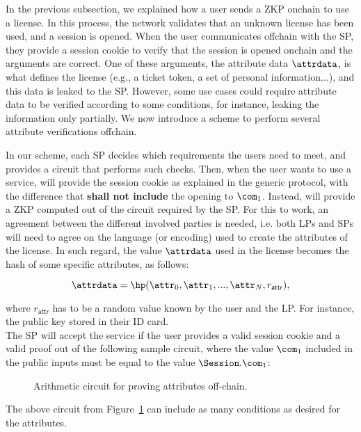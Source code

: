 
In the previous subsection, we explained how a user sends a ZKP onchain to use a license. In this process, the network validates that an unknown license has been used, and a session is opened. When the user communicates offchain with the SP, they provide a session cookie to verify that the session is opened onchain and the arguments are correct. One of these arguments, the attribute data $\attrdata$, is what defines the license (e.g., a ticket token, a set of personal information...), and this data is leaked to the SP. However, some use cases could require attribute data to be verified according to some conditions, for instance, leaking the information only partially. We now introduce a scheme to perform several attribute verifications offchain.

In our scheme, each SP decides which requirements the users need to meet, and provides a circuit that performs such checks. Then, when the user wants to use a service, will provide the session cookie as explained in the generic protocol, with the difference that \textbf{shall not include} the opening to $\com_1$. Instead, will provide a ZKP computed out of the circuit required by the SP. For this to work, an agreement between the different involved parties is needed, i.e. both LPs and SPs will need to agree on the language (or encoding) used to create the attributes of the license. In such regard, the value $\attrdata$ used in the license becomes the hash of some specific attributes, as follows:

$$\attrdata = \hp(\attr_0, \attr_1, ..., \attr_N, r_\mathsf{attr}),$$

where $r_\mathsf{attr}$ has to be a random value known by the user and the LP. For instance, the public key stored in their ID card.\\

The SP will accept the service if the user provides a valid session cookie and a valid proof out of the following sample circuit, where the value $\com_1$ included in the public inputs must be equal to the value $\Session.\com_1$:

\begin{figure}[H]
	\centering
	\setlength{\fboxsep}{5pt}%
	\setlength{\fboxrule}{0.3pt}%
	\caption{Arithmetic circuit for proving attributes off-chain.}
	\label{fig:circuit-offchain}
\end{figure}

\vspace{-0.3cm}
The above circuit from Figure~\ref{fig:circuit-offchain} can include as many conditions as desired for the attributes.